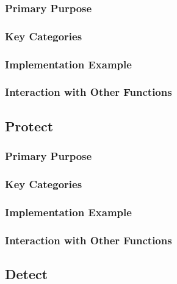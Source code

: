 \subsubsection{Primary Purpose}

\subsubsection{Key Categories}



\subsubsection{Implementation Example}

\subsubsection{Interaction with Other Functions}


\subsection{Protect}

\subsubsection{Primary Purpose}

\subsubsection{Key Categories}



\subsubsection{Implementation Example}

\subsubsection{Interaction with Other Functions}


\subsection{Detect}

